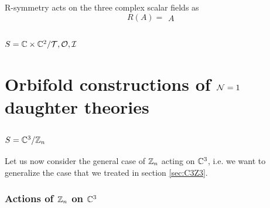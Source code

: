         R-symmetry acts on the three complex scalar fields as
        \begin{equation}
            R(A) =
            \begin{matrix}
                A
            \end{matrix}
        \end{equation}

    \subsection{$S=\mathbb{C}\times\mathbb{C}^2/\mathcal{T},\mathcal{O},\mathcal{I}$}






\section{Orbifold constructions of $\mathcal{N}=1$ daughter theories}

    \subsection{$S=\mathbb{C}^3/\mathbb{Z}_n$}

        Let us now consider the general case of $\mathbb{Z}_n$ acting on $\mathbb{C}^3$, i.e. we want to generalize the case that we treated in section \ref{sec:C3Z3}. 
        
        \subsubsection{Actions of $\mathbb{Z}_n$ on $\mathbb{C}^3$}
        
